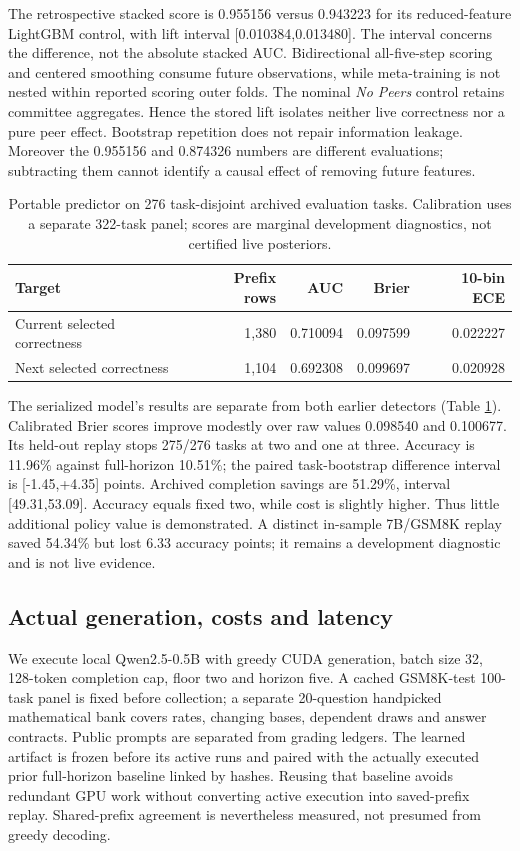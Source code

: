 \documentclass{article}
\begin{document}
The retrospective stacked score is 0.955156 versus 0.943223 for its
reduced-feature LightGBM control, with lift interval [0.010384,0.013480].
The interval concerns the difference, not the absolute stacked AUC.
Bidirectional all-five-step scoring and centered smoothing consume future
observations, while meta-training is not nested within reported scoring outer
folds. The nominal \emph{No Peers} control retains committee aggregates. Hence the
stored lift isolates neither live correctness nor a pure peer effect.
Bootstrap repetition does not repair information leakage. Moreover the
0.955156 and 0.874326 numbers are different evaluations; subtracting them cannot
identify a causal effect of removing future features.

\begin{table}[t]
\centering
\caption{Portable predictor on 276 task-disjoint archived evaluation tasks.
Calibration uses a separate 322-task panel; scores are marginal development
diagnostics, not certified live posteriors.}
\label{tab:probabilities}
\begin{tabular}{lrrrr}
\toprule
Target & Prefix rows & AUC & Brier & 10-bin ECE\\
\midrule
Current selected correctness & 1,380 & 0.710094 & 0.097599 & 0.022227\\
Next selected correctness & 1,104 & 0.692308 & 0.099697 & 0.020928\\
\bottomrule
\end{tabular}
\end{table}

The serialized model's results are separate from both earlier detectors
(Table \ref{tab:probabilities}). Calibrated Brier scores improve modestly over
raw values 0.098540 and 0.100677. Its held-out replay stops 275/276 tasks at two
and one at three. Accuracy is 11.96\% against full-horizon 10.51\%; the paired
task-bootstrap difference interval is [-1.45,+4.35] points. Archived completion
savings are 51.29\%, interval [49.31,53.09]. Accuracy equals fixed two, while
cost is slightly higher. Thus little additional policy value is demonstrated.
A distinct in-sample 7B/GSM8K replay saved 54.34\% but lost 6.33 accuracy points;
it remains a development diagnostic and is not live evidence.

\subsection{Actual generation, costs and latency}
We execute local Qwen2.5-0.5B with greedy CUDA generation, batch size 32,
128-token completion cap, floor two and horizon five. A cached GSM8K-test
100-task panel is fixed before collection; a separate 20-question handpicked
mathematical bank covers rates, changing bases, dependent draws and answer
contracts. Public prompts are separated from grading ledgers. The learned
artifact is frozen before its active runs and paired with the actually executed
prior full-horizon baseline linked by hashes. Reusing that baseline avoids
redundant GPU work without converting active execution into saved-prefix replay.
Shared-prefix agreement is nevertheless measured, not presumed from greedy
decoding.
\end{document}
